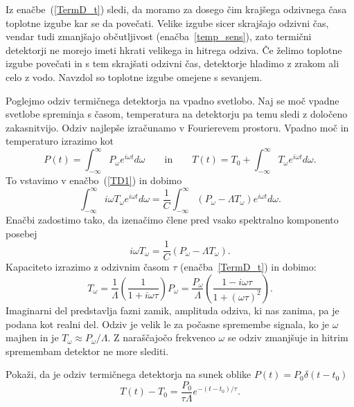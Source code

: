 Iz enačbe~(\ref{TermD_t}) sledi, da moramo za dosego čim krajšega odzivnega časa toplotne izgube 
kar se da povečati. Velike izgube sicer skrajšajo odzivni čas, 
vendar tudi zmanjšajo občutljivost (enačba~\ref{temp_sens}), 
zato termični detektorji ne morejo imeti hkrati velikega in hitrega odziva. 
Če želimo toplotne izgube povečati in s tem skrajšati odzivni čas, detektorje hladimo z zrakom 
ali celo z vodo. Navzdol so toplotne izgube omejene s sevanjem.  

Poglejmo odziv termičnega detektorja na vpadno svetlobo. Naj se  moč vpadne svetlobe
spreminja s časom, temperatura na detektorju pa temu sledi z določeno zakasnitvijo. Odziv
najlepše izračunamo v Fourierevem prostoru. Vpadno moč in temperaturo izrazimo kot
\begin{equation}
P(t) = \int_{-\infty}^{\infty} P_\omega e^{i\omega t}d\omega \qquad \mathrm{in} \qquad
T(t) = T_0 + \int_{-\infty}^{\infty} T_\omega e^{i\omega t}d\omega.
\label{TermTF}
\end{equation}
To vstavimo v enačbo~(\ref{TD1}) in dobimo
\begin{equation}
\int_{-\infty}^{\infty} i \omega T_\omega e^{i\omega t}d\omega = \frac{1}{C}
\int_{-\infty}^{\infty} (P_\omega - \Lambda T_\omega) e^{i\omega t}d\omega.
\end{equation}
Enačbi zadostimo tako, da izenačimo člene pred vsako spektralno komponento posebej
\begin{equation}
i \omega T_\omega = \frac{1}{C}\left(P_\omega - \Lambda T_\omega\right)\!.
\end{equation}
Kapaciteto izrazimo z odzivnim časom $\tau$ (enačba~\ref{TermD_t}) in dobimo:
\begin{equation}
T_\omega = \frac{1}{\Lambda}\left(\frac{1}{1+i \omega \tau}\right)P_\omega = 
\frac{P_\omega}{\Lambda}\left(\frac{1-i \omega \tau}{1+(\omega \tau)^2}\right)\!.
\label{TermOdziv}
\end{equation}
Imaginarni del predstavlja fazni zamik, amplituda odziva, ki nas zanima, pa je 
podana kot realni del. Odziv je velik le za počasne spremembe signala, ko
je $\omega$ majhen in je $T_\omega \approx P_\omega/\Lambda$. Z naraščajočo frekvenco
$\omega$ se odziv zmanjšuje in hitrim spremembam detektor ne more slediti. 
\begin{definition}
Pokaži, da je odziv termičnega detektorja na sunek oblike $P(t) = P_0\delta(t-t_0)$
\begin{equation}
T(t)-T_0=\frac{P_0}{\tau\Lambda}e^{-(t-t_0)/\tau}.
\end{equation}
\end{definition}

